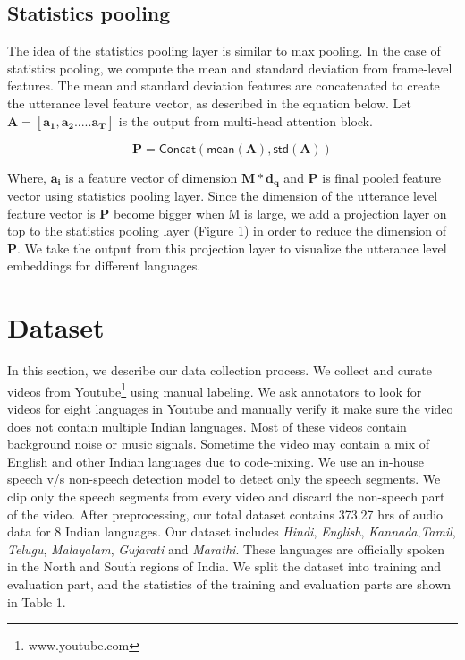 \documentclass{article}
\begin{document}
\subsection{Statistics pooling}
The idea of the statistics pooling layer is similar to max pooling. In the case of statistics pooling, we compute the mean and standard deviation from frame-level features. The mean and standard deviation features are concatenated to create the utterance level feature vector, as described in the equation below. Let $\boldsymbol{A=[a_1,a_2.....a_T]}$  is the output from multi-head attention block.

\begin{equation}
\boldsymbol{P} = \textsf{Concat}({\textsf{mean}(\boldsymbol{A})},{\textsf{std}(\boldsymbol{A})})
\end{equation}

Where, $\boldsymbol{a_i}$ is a feature vector of dimension $\boldsymbol{M*d_q}$ and $\boldsymbol{P}$ is final pooled feature vector using statistics pooling layer. Since the dimension of the utterance level feature vector is $\boldsymbol{P}$ become bigger when M is large, we add a projection layer on top to the statistics pooling layer (Figure 1) in order to reduce the dimension of $\boldsymbol{P}$. We take the output from this projection layer to visualize the utterance level embeddings for different languages.

\section{Dataset}
In this section, we describe our data collection process. We collect and curate videos from Youtube\footnote{www.youtube.com} using manual labeling. We ask annotators to look for videos for eight languages in Youtube and manually verify it make sure the video does not contain multiple Indian languages. Most of these videos contain background noise or music signals. Sometime the video may contain a mix of English and other Indian languages due to code-mixing. We use an in-house speech v/s non-speech detection model to detect only the speech segments. We clip only the speech segments from every video and discard the non-speech part of the video. After preprocessing, our total dataset contains 373.27 hrs of audio data for 8 Indian languages. Our dataset includes \textit{Hindi}, \textit{English}, \textit{Kannada},\textit{Tamil}, \textit{Telugu}, \textit{Malayalam}, \textit{Gujarati} and \textit{Marathi}. These languages are officially spoken in the North and South regions of India. We split the dataset into training and evaluation part, and the statistics of the training and evaluation parts are shown in Table 1.
\end{document}
